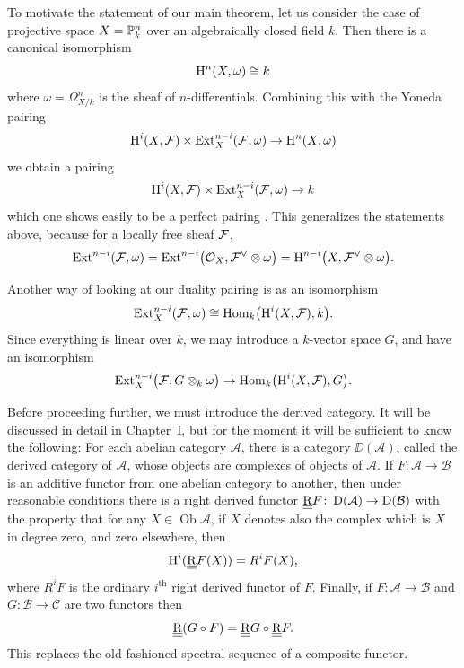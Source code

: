 To motivate the statement of our main theorem, let us consider the case of projective space $X=\mathbb{P}_{k}^{n}$ over an algebraically closed field $k$. Then there is a canonical isomorphism
\begin{equation}\label{eq:1}
	\operatorname{H}^{n}(X, \omega)\cong k
\end{equation}
where $\omega=\Omega_{X/k}^{n}$ is the sheaf of $n$-differentials. Combining this with the Yoneda pairing
\begin{equation}\label{eq:2}
	\operatorname{H}^{i}(X, \mathcal{F})\times \operatorname{Ext}_{X}^{n-i}(\mathcal{F},\omega)\to \operatorname{H}^{n}(X,\omega)
\end{equation}
we obtain a pairing
\begin{equation}\label{eq:3}
	\operatorname{H}^{i}(X, \mathcal{F})\times \operatorname{Ext}_{X}^{n-i}(\mathcal{F},\omega)\to k
\end{equation}
which one shows easily to be a perfect pairing \cite{SGA 62, expose 12}. This generalizes the statements above, because for a locally free sheaf $\mathcal{F}$,
\[
\operatorname{Ext}^{n-i}(\mathcal{F},\omega)=\operatorname{Ext}^{n-i}\bigl(\mathcal{O}_{X},\mathcal{F}^{\vee}\otimes\omega\bigr)=\operatorname{H}^{n-i}\bigl(X,\mathcal{F}^{\vee}\otimes\omega\bigr).
\]

Another way of looking at our duality pairing is as an isomorphism
\begin{equation}\label{eq:4}
	\operatorname{Ext}_{X}^{n-i}(\mathcal{F},\omega)\cong \operatorname{Hom}_{k}\bigl(\operatorname{H}^{i}(X,\mathcal{F}),k\bigr).
\end{equation}
Since everything is linear over $k$, we may introduce a $k$-vector space $G$, and have an isomorphism
\begin{equation}\label{eq:5}
	\operatorname{Ext}_{X}^{n-i}\bigl(\mathcal{F},G\otimes_{k}\omega\bigr)\to \operatorname{Hom}_{k}\bigl(\operatorname{H}^{i}(X,\mathcal{F}),G\bigr).
\end{equation}

Before proceeding further, we must introduce the derived category. It will be discussed in detail in Chapter~I, but for the moment it will be sufficient to know the following: For each abelian category $\mathcal{A}$, there is a category $\DD(\mathcal{A})$, called the derived category of $\mathcal{A}$, whose objects are complexes of objects of $\mathcal{A}$. If $F\colon\mathcal{A}\to\mathcal{B}$ is an additive functor from one abelian category to another, then under reasonable conditions there is a right derived functor $\underline{\underline{\operatorname{R}}} F\colon \operatorname{D}(\mathcal{A})\to \operatorname{D}(\mathcal{B})$ with the property that for any $X\in\operatorname{Ob}\mathcal{A}$, if $X$ denotes also the complex which is $X$ in degree zero, and zero elsewhere, then
\[
\operatorname{H}^{i}(\underline{\underline{\operatorname{R}}} F(X))=R^{i}F(X),
\]
where $R^{i}F$ is the ordinary $i^{\text{th}}$ right derived functor of $F$. Finally, if $F\colon\mathcal{A}\to\mathcal{B}$ and $G\colon\mathcal{B}\to\mathcal{C}$ are two functors then
\[
\underline{\underline{\operatorname{R}}}(G\circ F)=\underline{\underline{\operatorname{R}}} G\circ \underline{\underline{\operatorname{R}}} F.
\]
This replaces the old-fashioned spectral sequence of a composite functor.

